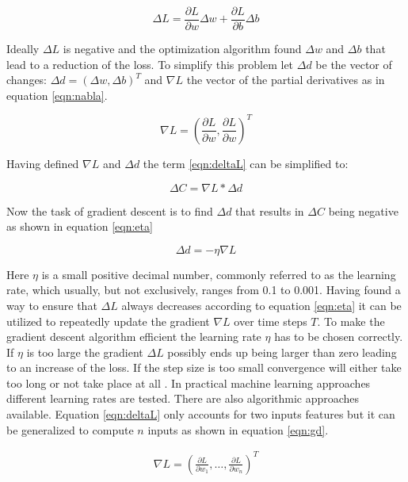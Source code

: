 \begin{equation}
  \Delta L = \frac{\partial L}{\partial w} \Delta w + \frac{\partial L}{\partial b} \Delta b
\label{eqn:deltaL} 
\end{equation}

Ideally $\Delta L$ is negative and the optimization algorithm found $\Delta w$ and $\Delta b$ that
lead to a reduction of the loss. To simplify this problem let $\Delta d$ be the vector of changes:
$\Delta d = (\Delta w , \Delta b)^T $ and $\nabla L$ the vector of the partial derivatives as in
equation \ref{eqn:nabla}.


\begin{equation}
 \nabla L = \left(\frac{\partial L}{\partial w}, \frac{\partial L}{\partial w}\right)^T
\label{eqn:nabla}
\end{equation}

Having defined $\nabla L$ and $\Delta d$ the term \ref{eqn:deltaL} can be simplified to:

\begin{equation}
\Delta C = \nabla L * \Delta d
 \label{eqn:cd}
\end{equation}

Now the task of gradient descent is to find $\Delta d$ that results in $\Delta C$ being negative as
shown in equation \ref{eqn:eta}

\begin{equation}
 \Delta d = -\eta \nabla L
 \label{eqn:eta}
\end{equation}

Here $\eta$ is a small positive decimal number, commonly referred to as the learning rate, which
usually, but not exclusively, ranges from 0.1 to 0.001.  Having found a way to ensure that
$\Delta L$ always decreases according to equation \ref{eqn:eta} it can be utilized to repeatedly
update the gradient $\nabla L$ over time steps $T$. To make the gradient descent algorithm efficient
the learning rate $\eta$ has to be chosen correctly. If $\eta$ is too large the gradient $\Delta L$
possibly ends up being larger than zero leading to an increase of the loss. If the step size is too
small convergence will either take too long or not take place at all
\cite{bergstra2011algorithms}. In practical machine learning approaches different learning rates are
tested. There are also algorithmic approaches available. Equation \ref{eqn:deltaL} only accounts for
two inputs features but it can be generalized to compute $n$ inputs as shown in equation
\ref{eqn:gd}.

\begin{eqnarray}
  \nabla L = \left(\frac{\partial L}{\partial w_1}, \ldots ,
  \frac{\partial L}{\partial w_n}\right)^T
 \label{eqn:gd}
\end{eqnarray}

